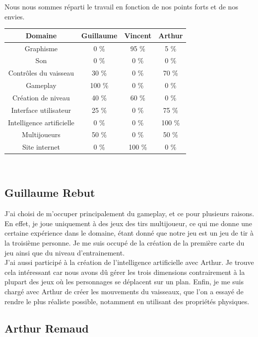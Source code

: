 \documentclass[12pt, titlepage]{article}
\begin{document}
\begin{spacing}{1.5}
Nous nous sommes réparti le travail en fonction de nos points forts et de nos envies.\\

\begin{center}
\begin{tabular}{|c|c|c|c|}
\hline
Domaine & Guillaume & Vincent & Arthur\\
\hline
Graphisme & 0 \% & 95 \% & 5 \%\\
\hline
Son & 0 \% & 0 \% & 0 \% \\
\hline
Contrôles du vaisseau & 30 \% & 0 \% & 70  \%\\
\hline
Gameplay & 100 \% & 0 \% & 0 \%\\
\hline
Création de niveau & 40 \% & 60 \% & 0 \%\\
\hline
Interface utilisateur & 25 \% & 0 \% & 75 \%\\
\hline
Intelligence artificielle & 0 \% & 0 \% & 100 \%\\
\hline
Multijoueurs & 50 \% & 0 \% & 50 \%\\
\hline
Site internet & 0 \% & 100 \% & 0 \%\\
\hline
\end{tabular}\\
\end{center}

\subsection{Guillaume Rebut}

J'ai choisi de m'occuper principalement du gameplay, et ce pour plusieurs raisons. En effet, je joue uniquement à des jeux des tirs multijoueur, ce qui me donne une certaine expérience dans le domaine, étant donné que notre jeu est un jeu de tir à la troisième personne. Je me suis occupé de la création de la première carte du jeu ainsi que du niveau d'entrainement.\\

J'ai aussi participé à la création de l'intelligence artificielle avec Arthur. Je trouve cela intéressant car nous avons dû gérer les trois dimensions contrairement à la plupart des jeux où les personnages se déplacent sur un plan. Enfin, je me suis chargé avec Arthur de créer les mouvements du vaisseaux, que l'on a essayé de rendre le plus réaliste possible, notamment en utilisant des propriétés physiques.\\

\subsection{Arthur Remaud}


\end{spacing}
\end{document}
